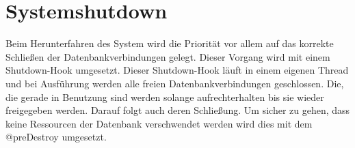 \section{Systemshutdown}

	Beim Herunterfahren des System wird die Priorität vor allem auf das korrekte Schließen der Datenbankverbindungen gelegt. Dieser Vorgang wird mit einem Shutdown-Hook umgesetzt. Dieser Shutdown-Hook läuft in einem eigenen Thread und bei Ausführung werden alle freien Datenbankverbindungen geschlossen. Die, die gerade in Benutzung sind werden solange aufrechterhalten bis sie wieder freigegeben werden. Darauf folgt auch deren Schließung. Um sicher zu gehen, dass keine Ressourcen der Datenbank verschwendet werden wird dies mit dem @preDestroy umgesetzt. 
   